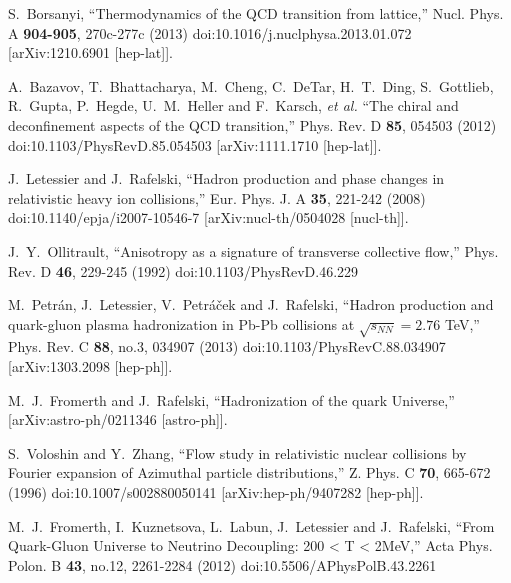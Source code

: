 \documentclass[universe,article,submit,moreauthors,pdftex,a4paper]{Definitions/mdpi}
\begin{document}
\begin{thebibliography}{99}
S.~Borsanyi,
``Thermodynamics of the QCD transition from lattice,''
Nucl. Phys. A \textbf{904-905}, 270c-277c (2013)
doi:10.1016/j.nuclphysa.2013.01.072
[arXiv:1210.6901 [hep-lat]].

A.~Bazavov, T.~Bhattacharya, M.~Cheng, C.~DeTar, H.~T.~Ding, S.~Gottlieb, R.~Gupta, P.~Hegde, U.~M.~Heller and F.~Karsch, \textit{et al.}
``The chiral and deconfinement aspects of the QCD transition,''
Phys. Rev. D \textbf{85}, 054503 (2012)
doi:10.1103/PhysRevD.85.054503
[arXiv:1111.1710 [hep-lat]].

J.~Letessier and J.~Rafelski,
``Hadron production and phase changes in relativistic heavy ion collisions,''
Eur. Phys. J. A \textbf{35}, 221-242 (2008)
doi:10.1140/epja/i2007-10546-7
[arXiv:nucl-th/0504028 [nucl-th]].

J.~Y.~Ollitrault,
``Anisotropy as a signature of transverse collective flow,''
Phys. Rev. D \textbf{46}, 229-245 (1992)
doi:10.1103/PhysRevD.46.229

M.~Petr\'an, J.~Letessier, V.~Petr\'a\v{c}ek and J.~Rafelski,
``Hadron production and quark-gluon plasma hadronization in Pb-Pb collisions at $\sqrt{s_{NN}}=2.76$ TeV,''
Phys. Rev. C \textbf{88}, no.3, 034907 (2013)
doi:10.1103/PhysRevC.88.034907
[arXiv:1303.2098 [hep-ph]].

M.~J.~Fromerth and J.~Rafelski,
``Hadronization of the quark Universe,''
[arXiv:astro-ph/0211346 [astro-ph]].

S.~Voloshin and Y.~Zhang,
``Flow study in relativistic nuclear collisions by Fourier expansion of Azimuthal particle distributions,''
Z. Phys. C \textbf{70}, 665-672 (1996)
doi:10.1007/s002880050141
[arXiv:hep-ph/9407282 [hep-ph]].

M.~J.~Fromerth, I.~Kuznetsova, L.~Labun, J.~Letessier and J.~Rafelski,
``From Quark-Gluon Universe to Neutrino Decoupling: 200 < T < 2MeV,''
Acta Phys. Polon. B \textbf{43}, no.12, 2261-2284 (2012)
doi:10.5506/APhysPolB.43.2261


\end{thebibliography}
\end{document}
